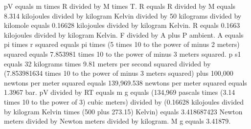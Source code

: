 pV equals m times R divided by M times T. R equals R divided by M equals 8.314 kilojoules divided by kilogram Kelvin divided by 50 kilograms divided by kilomole equals 0.16628 kilojoules divided by kilogram Kelvin. R equals 0.1663 kilojoules divided by kilogram Kelvin. F divided by A plus P ambient. A equals pi times r squared equals pi times (5 times 10 to the power of minus 2 meters) squared equals 7.853981 times 10 to the power of minus 3 meters squared. p s1 equals 32 kilograms times 9.81 meters per second squared divided by (7.853981634 times 10 to the power of minus 3 meters squared) plus 100,000 newtons per meter squared equals 139,969.538 newtons per meter squared equals 1.3967 bar. pV divided by RT equals m g equals (134,969 pascals times (3.14 times 10 to the power of 3) cubic meters) divided by (0.16628 kilojoules divided by kilogram Kelvin times (500 plus 273.15) Kelvin) equals 3.418687423 Newton meters divided by Newton meters divided by kilogram. M g equals 3.41879.